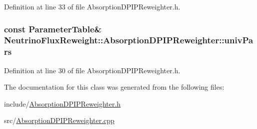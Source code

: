 Definition at line 33 of file Absorption\-D\-P\-I\-P\-Reweighter.\-h.

\hypertarget{class_neutrino_flux_reweight_1_1_absorption_d_p_i_p_reweighter_a47776d1d928633d93087b6fc9570f72d}{
\subsubsection[{univ\-Pars}]{\setlength{\rightskip}{0pt plus 5cm}const {\bf Parameter\-Table}\& Neutrino\-Flux\-Reweight\-::\-Absorption\-D\-P\-I\-P\-Reweighter\-::univ\-Pars}}\label{class_neutrino_flux_reweight_1_1_absorption_d_p_i_p_reweighter_a47776d1d928633d93087b6fc9570f72d}


Definition at line 30 of file Absorption\-D\-P\-I\-P\-Reweighter.\-h.



The documentation for this class was generated from the following files\-:\begin{DoxyCompactItemize}
\item 
include/\hyperlink{_absorption_d_p_i_p_reweighter_8h}{Absorption\-D\-P\-I\-P\-Reweighter.\-h}\item 
src/\hyperlink{_absorption_d_p_i_p_reweighter_8cpp}{Absorption\-D\-P\-I\-P\-Reweighter.\-cpp}\end{DoxyCompactItemize}
